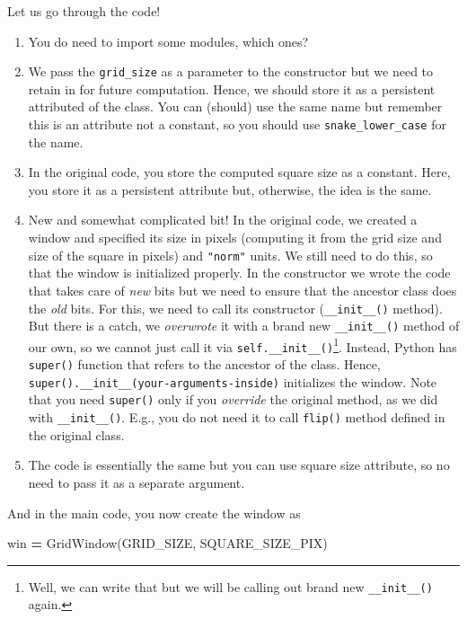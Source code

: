\documentclass[
]{book}
\newenvironment{Shaded}{\begin{snugshade}}{\end{snugshade}}
\newcommand{\NormalTok}[1]{#1}
\newcommand{\OperatorTok}[1]{\textcolor[rgb]{0.81,0.36,0.00}{\textbf{#1}}}
\providecommand{\tightlist}{%
  \setlength{\itemsep}{0pt}\setlength{\parskip}{0pt}}
\begin{document}
Let us go through the code!

\begin{enumerate}
\def\labelenumi{\arabic{enumi}.}
\tightlist
\item
  You do need to import some modules, which ones?
\item
  We pass the \texttt{grid\_size} as a parameter to the constructor but we need to retain in for future computation. Hence, we should store it as a persistent attributed of the class. You can (should) use the same name but remember this is an attribute not a constant, so you should use \texttt{snake\_lower\_case} for the name.
\item
  In the original code, you store the computed square size as a constant. Here, you store it as a persistent attribute but, otherwise, the idea is the same.
\item
  New and somewhat complicated bit! In the original code, we created a window and specified its size in pixels (computing it from the grid size and size of the square in pixels) and \texttt{"norm"} units. We still need to do this, so that the window is initialized properly. In the constructor we wrote the code that takes care of \emph{new} bits but we need to ensure that the ancestor class does the \emph{old} bits. For this, we need to call its constructor (\texttt{\_\_init\_\_()} method). But there is a catch, we \emph{overwrote} it with a brand new \texttt{\_\_init\_\_()} method of our own, so we cannot just call it via \texttt{self.\_\_init\_\_()}\footnote{Well, we can write that but we will be calling out brand new \texttt{\_\_init\_\_()} again.}. Instead, Python has \texttt{super()} function that refers to the ancestor of the class. Hence, \texttt{super().\_\_init\_\_(your-arguments-inside)} initializes the window. Note that you need \texttt{super()} only if you \emph{override} the original method, as we did with \texttt{\_\_init\_\_()}. E.g., you do not need it to call \texttt{flip()} method defined in the original class.
\item
  The code is essentially the same but you can use square size attribute, so no need to pass it as a separate argument.
\end{enumerate}

And in the main code, you now create the window as

\begin{Shaded}
\begin{Highlighting}[]
\NormalTok{win }\OperatorTok{=}\NormalTok{ GridWindow(GRID\_SIZE, SQUARE\_SIZE\_PIX)}
\end{Highlighting}
\end{Shaded}
\end{document}
